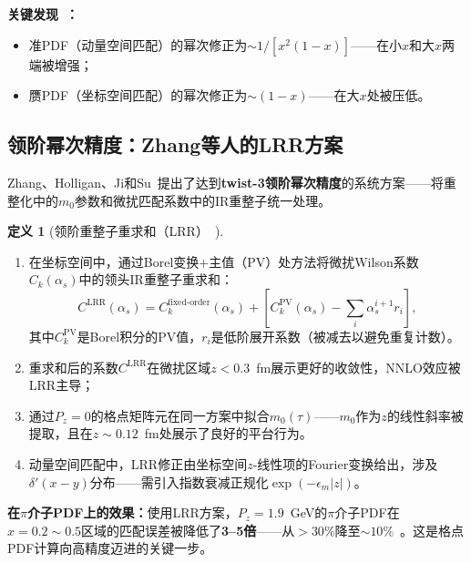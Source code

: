 \documentclass[12pt,a4paper]{ctexart}
\theoremstyle{definition}
\newtheorem{definition}{定义}[section]
\begin{document}
\textbf{关键发现~\cite{Braun2019power}：}
\begin{itemize}[nosep]
    \item 准PDF（动量空间匹配）的幂次修正为$\sim 1/[x^2(1-x)]$——在小$x$和大$x$两端被增强；
    \item 赝PDF（坐标空间匹配）的幂次修正为$\sim (1-x)$——在大$x$处被压低。
\end{itemize}

\subsection{领阶幂次精度：Zhang等人的LRR方案}

Zhang、Holligan、Ji和Su~\cite{Zhang2023leadingPower}提出了达到\textbf{twist-3领阶幂次精度}的系统方案——将重整化中的$m_0$参数和微扰匹配系数中的IR重整子统一处理。

\begin{definition}[领阶重整子重求和（LRR）~\cite{Zhang2023leadingPower}]
\begin{enumerate}[nosep]
    \item 在坐标空间中，通过Borel变换+主值（PV）处方法将微扰Wilson系数$C_k(\alpha_s)$中的领头IR重整子重求和：
    \begin{equation}
    C^{\text{LRR}}(\alpha_s) = C_{k}^{\text{fixed-order}}(\alpha_s) + \left[ C_{k}^{\text{PV}}(\alpha_s) - \sum_i \alpha_s^{i+1} r_i \right],
    \end{equation}
    其中$C_{k}^{\text{PV}}$是Borel积分的PV值，$r_i$是低阶展开系数（被减去以避免重复计数）。

    \item 重求和后的系数$C^{\text{LRR}}$在微扰区域$z < 0.3$~fm展示更好的收敛性，NNLO效应被LRR主导；

    \item 通过$P_z=0$的格点矩阵元在同一方案中拟合$m_0(\tau)$——$m_0$作为$z$的线性斜率被提取，且在$z \sim 0.12$~fm处展示了良好的平台行为。

    \item 动量空间匹配中，LRR修正由坐标空间$z$-线性项的Fourier变换给出，涉及$\delta'(x-y)$分布——需引入指数衰减正规化$\exp(-\epsilon_m|z|)$。
\end{enumerate}
\end{definition}

\textbf{在$\pi$介子PDF上的效果：}使用LRR方案，$P_z=1.9$~GeV的$\pi$介子PDF在$x=0.2\sim0.5$区域的匹配误差被降低了\textbf{3--5倍}——从$>30\%$降至$\sim 10\%$~\cite{Zhang2023leadingPower}。这是格点PDF计算向高精度迈进的关键一步。
\end{document}
